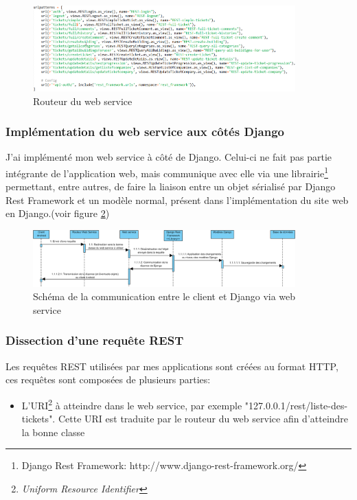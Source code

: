 \documentclass[12pt,table,a4paper]{report}
\begin{document}
\begin{figure}
	\centering
		\includegraphics[width=0.90\textwidth]{images/code-snippets/exemple-routeur-webservice.png}
	\caption{Routeur du web service}
	\label{fig:exemple-routeur-webservice}
\end{figure}

\subsubsection{Implémentation du web service aux côtés Django}
J'ai implémenté mon web service à côté de Django. Celui-ci ne fait pas partie intégrante de l'application web, mais communique avec elle via une librairie\footnote{Django Rest Framework: http://www.django-rest-framework.org/} permettant, entre autres, de faire la liaison entre un objet sérialisé par Django Rest Framework et un modèle normal, présent dans l'implémentation du site web en Django.(voir figure \ref{fig:communication-django-webservice-android})

\begin{figure}
\centering
\includegraphics[width=0.9\textwidth]{images/schemas/communication-django-webservice-android.png}
\caption{Schéma de la communication entre le client et Django via web service}
\label{fig:communication-django-webservice-android}
\end{figure}

\subsubsection{Dissection d'une requête REST}
Les requêtes REST utilisées par mes applications sont créées au format HTTP, ces requêtes sont composées de plusieurs parties:

\begin{itemize}
\item L'URI\footnote{\textit{Uniform Resource Identifier}} à atteindre dans le web service, par exemple "127.0.0.1/rest/liste-des-tickets". Cette URI est traduite par le routeur du web service afin d'atteindre la bonne classe
\end{itemize}
\end{document}
